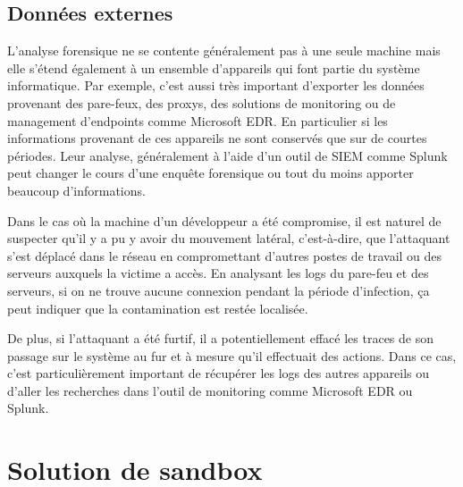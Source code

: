 \subsection{Données externes}

L'analyse forensique ne se contente généralement pas à une seule machine mais elle s'étend également à un ensemble d'appareils qui font partie du système informatique. Par exemple, c'est aussi très important d'exporter les données provenant des pare-feux, des proxys, des solutions de monitoring ou de management d'endpoints comme Microsoft EDR. En particulier si les informations provenant de ces appareils ne sont conservés que sur de courtes périodes. Leur analyse, généralement à l'aide d'un outil de SIEM comme Splunk peut changer le cours d'une enquête forensique ou tout du moins apporter beaucoup d'informations.

\begin{example}
    \hspace{0.45cm} Dans le cas où la machine d'un développeur a été compromise, il est naturel de suspecter qu'il y a pu y avoir du mouvement latéral, c'est-à-dire, que l'attaquant s'est déplacé dans le réseau en compromettant d'autres postes de travail ou des serveurs auxquels la victime a accès. En analysant les logs du pare-feu et des serveurs, si on ne trouve aucune connexion pendant la période d'infection, ça peut indiquer que la contamination est restée localisée.

    De plus, si l'attaquant a été furtif, il a potentiellement effacé les traces de son passage sur le système au fur et à mesure qu'il effectuait des actions. Dans ce cas, c'est particulièrement important de récupérer les logs des autres appareils ou d'aller les recherches dans l'outil de monitoring comme Microsoft EDR ou Splunk.
\end{example}










\section{Solution de sandbox}

